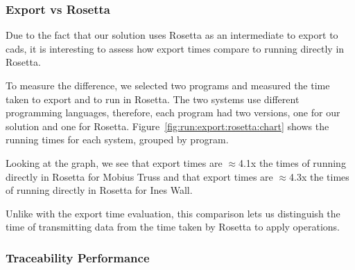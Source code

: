 

\subsubsection{Export vs Rosetta}
Due to the fact that our solution uses Rosetta as an intermediate to export to \glspl{cad}, it is interesting to assess how export times compare to running directly in Rosetta.

To measure the difference, we selected two programs and measured the time taken to export and to run in Rosetta.
The two systems use different programming languages, therefore, each program had two versions, one for our solution and one for Rosetta.
Figure~\ref{fig:run:export:rosetta:chart} shows the running times for each system, grouped by program.

Looking at the graph, we see that export times are $\approx$4.1x the times of running directly in Rosetta for Mobius Truss and that export times are $\approx$4.3x the times of running directly in Rosetta for Ines Wall.


Unlike with the export time evaluation, this comparison lets us distinguish the time of transmitting data from the time taken by Rosetta to apply operations.



\subsubsection{Traceability Performance}

